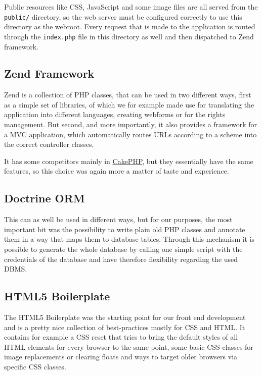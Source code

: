Public resources like CSS, JavaScript and some image files are all served from the \texttt{public/} directory, so the web server must be configured correctly to use this directory as the webroot. Every request that is made to the application is routed through the \texttt{index.php} file in this directory as well and then dispatched to Zend framework.

\subsection{Zend Framework}

Zend is a collection of PHP classes, that can be used in two different ways, first as a simple set of libraries, of which we for example made use for translating the application into different languages, creating webforms or for the rights management. But second, and more importantly, it also provides a framework for a MVC application, which automatically routes URLs according to a scheme into the correct controller classes.

It has some competitors mainly in \href{http://cakephp.de/}{CakePHP}, but they essentially have the same features, so this choice was again more a matter of taste and experience.

\subsection{Doctrine ORM}

This can as well be used in different ways, but for our purposes, the most important bit was the possibility to write plain old PHP classes and annotate them in a way that maps them to database tables. Through this mechanism it is possible to generate the whole database by calling one simple script with the credentials of the database and have therefore flexibility regarding the used DBMS.

\subsection{HTML5 Boilerplate}

The HTML5 Boilerplate was the starting point for our front end development and is a pretty nice collection of best-practices mostly for CSS and HTML. It contains for example a CSS reset that tries to bring the default styles of all HTML elements for every browser to the same point, some basic CSS classes for image replacements or clearing floats and ways to target older browsers via specific CSS classes.

